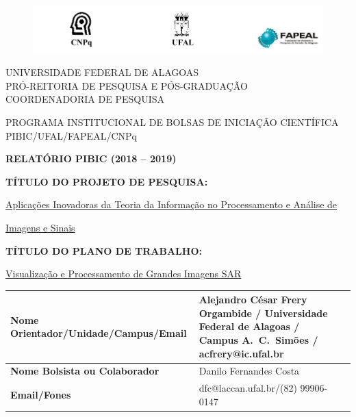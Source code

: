 \documentclass[12pt]{article}
\begin{document}
\thispagestyle{empty}
\begin{center}
\vspace{0.2cm}

\begin{figure}
    \centering
    \includegraphics[width = \linewidth]{header.png}
\end{figure}
\vspace{-1cm}
\hrulefill

UNIVERSIDADE FEDERAL DE ALAGOAS\\
PRÓ-REITORIA DE PESQUISA E PÓS-GRADUAÇÃO\\
COORDENADORIA DE PESQUISA

\hrulefill

\vspace{0.5cm}

PROGRAMA INSTITUCIONAL DE BOLSAS DE INICIAÇÃO CIENTÍFICA\\PIBIC/UFAL/FAPEAL/CNPq

\vspace{1.0cm}

\textbf{RELATÓRIO PIBIC (2018 -- 2019)}\\

\end{center}

\vspace{1.2cm}

\textbf{TÍTULO DO PROJETO DE PESQUISA:}

\underline{Aplicações Inovadoras da Teoria da Informação no Processamento e Análise de}

\underline{Imagens e Sinais}

\textbf{TÍTULO DO PLANO DE TRABALHO:}

\underline{Visualização e Processamento de Grandes Imagens SAR}

\vspace{1cm}

\begin{table}[!h]
\begin{center}
\begin{tabularx}{\textwidth}{|X|X|X|}
\hline                              
\textbf{Nome Orientador/Unidade/Campus/Email} &  Alejandro César Frery Orgambide / Universidade Federal de Alagoas / Campus A.\ C.\ Simões / acfrery@ic.ufal.br\\
\hline     
\textbf{Nome Bolsista ou Colaborador} & Danilo Fernandes Costa\\
\hline     
\textbf{Email/Fones} & dfc@laccan.ufal.br/(82) 99906-0147\\
\hline     
\end{tabularx}
\end{center}
\end{table}
\end{document}
